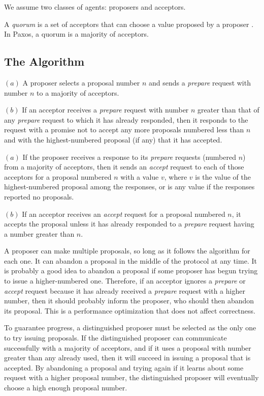 We assume two classes of agents: proposers and acceptors.

A \emph{quorum} is a set of acceptors that can choose a value proposed by a proposer \cite{Lamport06}.
In Paxos, a quorum is a majority of acceptors.

\subsection{The Algorithm}

\begin{phase}
    $(a)$ A proposer selects a proposal number $n$ and sends a \emph{prepare} request with number $n$ to a majority of acceptors.
    
    $(b)$ If an acceptor receives a \emph{prepare} request with number $n$ greater than that of any \emph{prepare} request to which it has already responded, then it responds to the request with a promise not to accept any more proposals numbered less than $n$ and with the highest-numbered proposal (if any) that it has accepted.
\end{phase}

\begin{phase}
    $(a)$ If the proposer receives a response to its \emph{prepare} requests (numbered $n$) from a majority of acceptors, then it sends an \emph{accept} request to each of those acceptors for a proposal numbered $n$ with a value $v$, where $v$ is the value of the highest-numbered proposal among the responses, or is any value if the responses reported no proposals.

    $(b)$ If an acceptor receives an \emph{accept} request for a proposal numbered $n$, it accepts the proposal unless it has already responded to a \emph{prepare} request having a number greater than $n$.
\end{phase}

A proposer can make multiple proposals, so long as it follows the algorithm for each one.
It can abandon a proposal in the middle of the protocol at any time.
It is probably a good idea to abandon a proposal if some proposer has begun trying to issue a higher-numbered one.
Therefore, if an acceptor ignores a \emph{prepare} or \emph{accept} request because it has already received a \emph{prepare} request with a higher number, then it should probably inform the proposer, who should then abandon its proposal.
This is a performance optimization that does not affect correctness.

To guarantee progress, a distinguished proposer must be selected as the only one to try issuing proposals.
If the distinguished proposer can communicate successfully with a majority of acceptors, and if it uses a proposal with number greater than any already used, then it will succeed in issuing a proposal that is accepted.
By abandoning a proposal and trying again if it learns about some request with a higher proposal number, the distinguished proposer will eventually choose a high enough proposal number.

